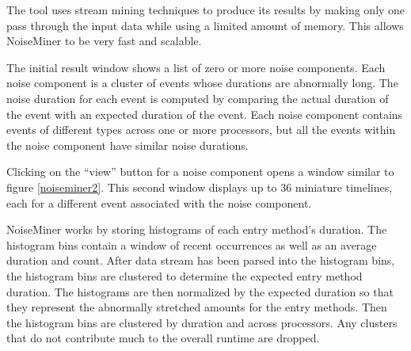 The tool uses stream mining techniques to produce its results by making only one pass through the input data while using a limited amount of memory. This allows NoiseMiner to be very fast and scalable. 


The initial result window shows a list of zero or more noise
components. Each noise component is a cluster of events whose
durations are abnormally long. The noise duration for each event is
computed by comparing the actual duration of the event with an
expected duration of the event. Each noise component contains events
of different types across one or more processors, but all the events
within the noise component have similar noise durations. 

Clicking on the ``view'' button for a noise component opens a window similar to
figure \ref{noiseminer2}. This second window displays up to 36
miniature timelines, each for a different event associated with the
noise component.



NoiseMiner works by storing histograms of each entry method's
duration. The histogram bins contain a window of recent occurrences as
well as an average duration and count. After data stream has been
parsed into the histogram bins, the histogram bins are clustered to
determine the expected entry method duration. The histograms are
then normalized by the expected duration so that they represent the
abnormally stretched amounts for the entry methods. Then the histogram
bins are clustered by duration and across processors. Any clusters
that do not contribute much to the overall runtime are
dropped. 